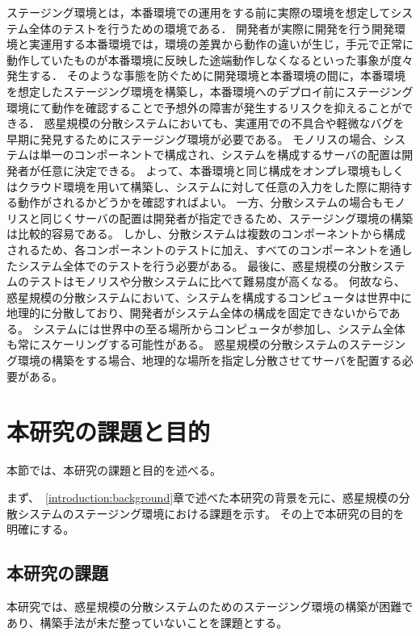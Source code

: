 ステージング環境とは，本番環境での運用をする前に実際の環境を想定してシステム全体のテストを行うための環境である．
開発者が実際に開発を行う開発環境と実運用する本番環境では，環境の差異から動作の違いが生じ，手元で正常に動作していたものが本番環境に反映した途端動作しなくなるといった事象が度々発生する．
そのような事態を防ぐために開発環境と本番環境の間に，本番環境を想定したステージング環境を構築し，本番環境へのデプロイ前にステージング環境にて動作を確認することで予想外の障害が発生するリスクを抑えることができる．
惑星規模の分散システムにおいても、実運用での不具合や軽微なバグを早期に発見するためにステージング環境が必要である。
モノリスの場合、システムは単一のコンポーネントで構成され、システムを構成するサーバの配置は開発者が任意に決定できる。
よって、本番環境と同じ構成をオンプレ環境もしくはクラウド環境を用いて構築し、システムに対して任意の入力をした際に期待する動作がされるかどうかを確認すればよい。
一方、分散システムの場合もモノリスと同じくサーバの配置は開発者が指定できるため、ステージング環境の構築は比較的容易である。
しかし、分散システムは複数のコンポーネントから構成されるため、各コンポーネントのテストに加え、すべてのコンポーネントを通したシステム全体でのテストを行う必要がある。
最後に、惑星規模の分散システムのテストはモノリスや分散システムに比べて難易度が高くなる。
何故なら、惑星規模の分散システムにおいて、システムを構成するコンピュータは世界中に地理的に分散しており、開発者がシステム全体の構成を固定できないからである。
システムには世界中の至る場所からコンピュータが参加し、システム全体も常にスケーリングする可能性がある。
惑星規模の分散システムのステージング環境の構築をする場合、地理的な場所を指定し分散させてサーバを配置する必要がある。

\section{本研究の課題と目的}
\label{introduction:issue-aim}

本節では、本研究の課題と目的を述べる。

まず、~\ref{introduction:background}章で述べた本研究の背景を元に、惑星規模の分散システムのステージング環境における課題を示す。
その上で本研究の目的を明確にする。

\subsection{本研究の課題}
\label{introduction:issue-aim:issue}

本研究では、惑星規模の分散システムのためのステージング環境の構築が困難であり、構築手法が未だ整っていないことを課題とする。

